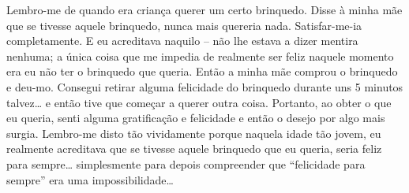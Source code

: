 Lembro-me de quando era criança querer um certo brinquedo. Disse à minha mãe que
se tivesse aquele brinquedo, nunca mais quereria nada. Satisfar-me-ia
completamente. E eu acreditava naquilo -- não lhe estava a dizer mentira
nenhuma; a única coisa que me impedia de realmente ser feliz naquele momento era
eu não ter o brinquedo que queria. Então a minha mãe comprou o brinquedo e
deu-mo. Consegui retirar alguma felicidade do brinquedo durante uns 5 minutos
talvez\ldots{} e então tive que começar a querer outra coisa. Portanto, ao
obter o que eu queria, senti alguma gratificação e felicidade e então o desejo
por algo mais surgia. Lembro-me disto tão vividamente porque naquela idade tão
jovem, eu realmente acreditava que se tivesse aquele brinquedo que eu queria,
seria feliz para sempre\ldots{} simplesmente para depois compreender que
``felicidade para sempre'' era uma impossibilidade\ldots{}

